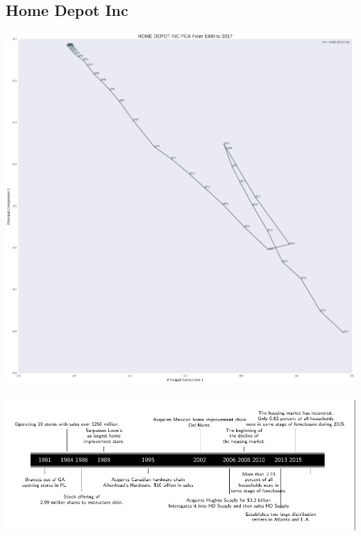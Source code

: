\subsection{Home Depot Inc}
\includegraphics[width=1\textwidth]{./Home_Depot}\\[0.1in] \\
\includegraphics[width=1\textwidth]{./Home_Depottimeline}\\[0.1in] \\
